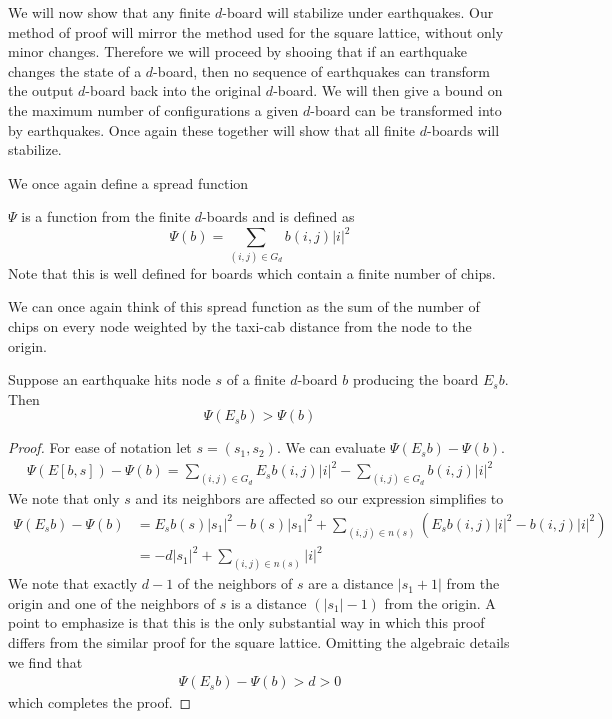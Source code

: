 \documentclass[runningheads,a4paper]{llncs}
\begin{document}
We will now show that any finite $d$-board will stabilize under earthquakes. Our method of proof will mirror the method used for the square lattice, without only minor changes.  Therefore we will proceed by shooing that if an earthquake changes the state of a $d$-board, then no sequence of earthquakes can transform the output $d$-board back into the original $d$-board. We will then give a bound on the maximum number of configurations a given $d$-board can be transformed into by earthquakes. Once again these together will show that all finite $d$-boards will stabilize.

We once again define a spread function 
\begin{definition}
$\Psi$ is a function from the finite $d$-boards and is defined as
\begin{equation}
\Psi(b) = \sum_{(i,j) \in G_d} b(i,j) |i|^2
\end{equation}
Note that this is well defined for boards which contain a finite number of chips. 
\end{definition} 
We can once again think of this spread function as the sum of the number of chips on every node weighted by the taxi-cab distance from the node to the origin.

\begin{lemma} 
Suppose an earthquake hits node $s$ of a finite $d$-board $b$ producing the board $E_s b$. Then
\begin{equation*}
\Psi( E_s b) > \Psi (b)
\end{equation*}
\end{lemma}
\begin{proof}
For ease of notation let $s=(s_1, s_2)$. We can evaluate $\Psi(E_s b) - \Psi(b)$.
\begin{align}
\Psi(E[b, s])-\Psi(b) = \sum_{(i,j) \in G_d} E_s b (i,j)|i|^2 - \sum_{(i,j) \in G_d} b(i,j)|i|^2 
\end{align}
We note that only $s$ and its neighbors are affected so our expression simplifies to
\begin{align*}
\Psi(E_s b ) - \Psi(b) &= E_s b (s) |s_1|^2 - b(s) |s_1|^2 + \sum_{(i,j) \in n(s)} (E_s b (i,j) |i|^2 - b(i,j)|i|^2) \\
&= -d |s_1|^2 + \sum_{(i,j) \in n(s)} |i|^2
\end{align*}
We note that exactly $d-1$ of the neighbors of $s$ are a distance $|s_1 +1|$ from the origin and one of the neighbors of $s$ is a distance $(|s_1| - 1)$ from the origin.  A point to emphasize is that this is the only substantial way in which this proof differs from the similar proof for the square lattice. Omitting the algebraic details we find that 
\begin{align*}
\Psi( E_s b) - \Psi(b) > d >0
\end{align*}
which completes the proof.
\end{proof}
\end{document}
